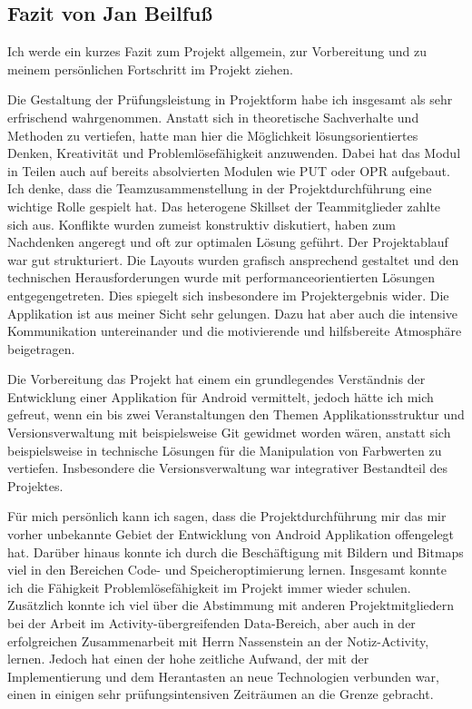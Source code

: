 \subsection{Fazit von Jan Beilfuß}

Ich werde ein kurzes Fazit zum Projekt allgemein, zur Vorbereitung und zu meinem persönlichen Fortschritt im Projekt ziehen.

Die Gestaltung der Prüfungsleistung in Projektform habe ich insgesamt als sehr erfrischend wahrgenommen. Anstatt sich in theoretische Sachverhalte und Methoden zu vertiefen, hatte man hier die Möglichkeit lösungsorientiertes Denken, Kreativität und Problemlösefähigkeit anzuwenden. Dabei hat das Modul in Teilen auch auf bereits absolvierten Modulen wie PUT oder OPR aufgebaut. Ich denke, dass die Teamzusammenstellung in der Projektdurchführung eine wichtige Rolle gespielt hat. Das heterogene Skillset der Teammitglieder zahlte sich aus. Konflikte wurden zumeist konstruktiv diskutiert, haben zum Nachdenken angeregt und oft zur optimalen Lösung geführt. Der Projektablauf war gut strukturiert. Die Layouts wurden grafisch ansprechend gestaltet und den technischen Herausforderungen wurde mit performanceorientierten Lösungen entgegengetreten. Dies spiegelt sich insbesondere im Projektergebnis wider. Die Applikation ist aus meiner Sicht sehr gelungen. Dazu hat aber auch die intensive Kommunikation untereinander und die motivierende und hilfsbereite Atmosphäre beigetragen.

Die Vorbereitung das Projekt hat einem ein grundlegendes Verständnis der Entwicklung einer Applikation für Android vermittelt, jedoch hätte ich mich gefreut, wenn ein bis zwei Veranstaltungen den Themen Applikationsstruktur und Versionsverwaltung mit beispielsweise Git gewidmet worden wären, anstatt sich beispielsweise in technische Lösungen für die Manipulation von Farbwerten zu vertiefen. Insbesondere die Versionsverwaltung war integrativer Bestandteil des Projektes.

Für mich persönlich kann ich sagen, dass die Projektdurchführung mir das mir vorher unbekannte Gebiet der Entwicklung von Android Applikation offengelegt hat. Darüber hinaus konnte ich durch die Beschäftigung mit Bildern und Bitmaps viel in den Bereichen Code- und Speicheroptimierung lernen. Insgesamt konnte ich die Fähigkeit Problemlösefähigkeit im Projekt immer wieder schulen. Zusätzlich konnte ich viel über die Abstimmung mit anderen Projektmitgliedern bei der Arbeit im Activity-übergreifenden Data-Bereich, aber auch in der erfolgreichen Zusammenarbeit mit Herrn Nassenstein an der Notiz-Activity, lernen. Jedoch hat einen der hohe zeitliche Aufwand, der mit der Implementierung und dem Herantasten an neue Technologien verbunden war, einen in einigen sehr prüfungsintensiven Zeiträumen an die Grenze gebracht.

